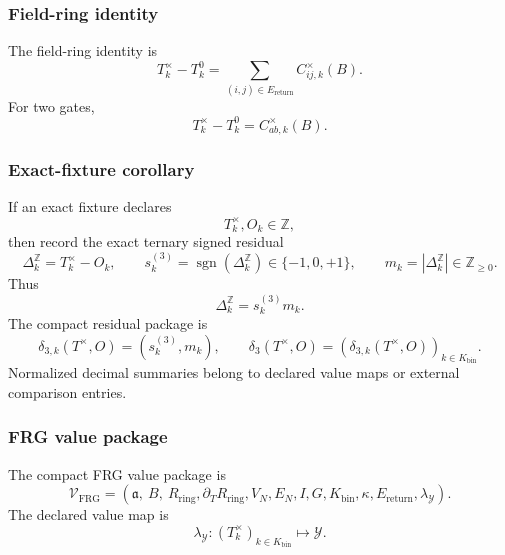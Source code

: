 \subsubsection{Field-ring identity}
\label{subsec:frg-identity}
The field-ring identity is
\begin{equation}
T_k^\times-T_k^0
=
\sum_{(i,j)\in E_{\mathrm{return}}}
C_{ij,k}^{\times}(B).
\tag{RG8}
\label{eq:frg-identity}
\end{equation}
For two gates,
\begin{equation}
T_k^\times-T_k^0=C_{ab,k}^{\times}(B).
\tag{RG9}
\label{eq:frg-identity-two-gate}
\end{equation}

\subsubsection{Exact-fixture corollary}
\label{subsec:frg-delta-three-corollary}
If an exact fixture declares
\[
T_k^\times,O_k\in\mathbb Z,
\]
then record the exact ternary signed residual
\begin{equation}
\Delta_k^{\mathbb Z}=T_k^\times-O_k,
\qquad
s_k^{(3)}=\operatorname{sgn}(\Delta_k^{\mathbb Z})\in\{-1,0,+1\},
\qquad
m_k=|\Delta_k^{\mathbb Z}|\in\mathbb Z_{\ge0}.
\label{eq:frg-delta-three-components}
\end{equation}
Thus
\begin{equation}
\Delta_k^{\mathbb Z}=s_k^{(3)}m_k.
\label{eq:frg-delta-three-signed-product}
\end{equation}
The compact residual package is
\begin{equation}
\delta_{3,k}(T^\times,O)=(s_k^{(3)},m_k),
\qquad
\delta_3(T^\times,O)
=
\left(\delta_{3,k}(T^\times,O)\right)_{k\in K_{\mathrm{bin}}}.
\tag{RG10}
\label{eq:frg-delta-three}
\end{equation}
Normalized decimal summaries belong to declared value maps or external comparison entries.

\subsubsection{FRG value package}
\label{subsec:frg-value-package}
The compact FRG value package is
\begin{equation}
\mathcal V_{\mathrm{FRG}}
=
(\mathfrak a,\ B,\ R_{\mathrm{ring}},\partial_T R_{\mathrm{ring}},
V_N,E_N,I,G,K_{\mathrm{bin}},\kappa,E_{\mathrm{return}},\lambda_{\mathcal Y}).
\tag{RG11}
\label{eq:frg-value-package}
\end{equation}
The declared value map is
\begin{equation}
\lambda_{\mathcal Y}:
(T_k^\times)_{k\in K_{\mathrm{bin}}}
\mapsto
\mathcal Y.
\tag{RG12}
\label{eq:frg-value-map}
\end{equation}

